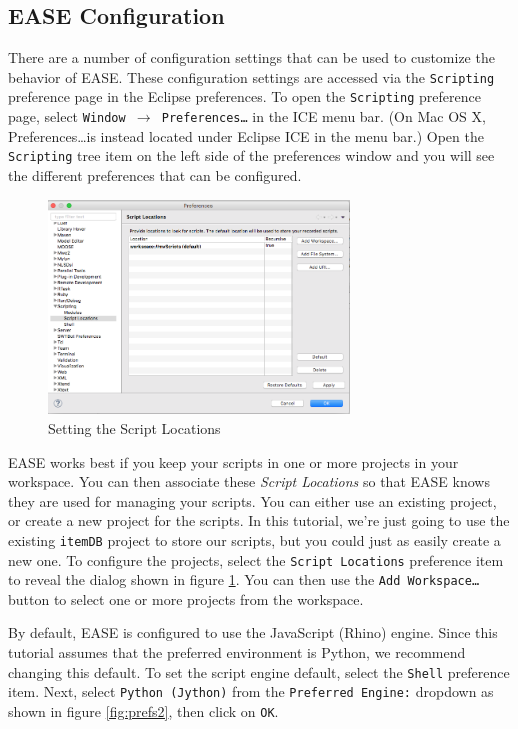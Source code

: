 \subsection{EASE Configuration}

There are a number of configuration settings that can be used to customize the
behavior of EASE. These configuration settings are accessed via the \texttt{Scripting}
preference page in the Eclipse preferences. To open the \texttt{Scripting}
preference page, select \texttt{Window $\rightarrow$ Preferences\ldots} in the
ICE menu bar. (On Mac OS X, Preferences\ldots is instead located under Eclipse
ICE in the menu bar.) Open the \texttt{Scripting} tree item on the left side of
the preferences window and you will see the different preferences that can be
configured.

\begin{figure}[!ht]
\centering
\includegraphics[width=8cm]{images/scripting-prefs1}
\caption{Setting the Script Locations}
\label{fig:prefs1}
\end{figure}

EASE works best if you keep your scripts in one or more projects in
your workspace. You can then associate these \emph{Script Locations} so
that EASE knows they are used for managing your scripts. You can either use an
existing project, or create a new project for the scripts. In this tutorial,
we're just going to use the existing \texttt{itemDB} project to store our scripts, but
you could just as easily create a new one. To configure the projects, select the
\texttt{Script Locations} preference item to reveal the dialog shown in figure
\ref{fig:prefs1}. You can then use the \texttt{Add Workspace\ldots} button to
select one or more projects from the workspace.

By default, EASE is configured to use the JavaScript (Rhino) engine.
Since this tutorial assumes that the preferred environment is Python, we recommend changing
this default. To set the script engine default, select the
\texttt{Shell} preference item. Next, select \texttt{Python (Jython)} from
the \texttt{Preferred Engine:} dropdown as shown in figure \ref{fig:prefs2},
then click on \texttt{OK}.

